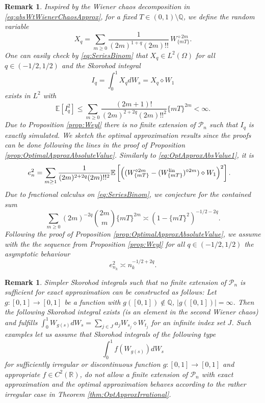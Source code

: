 \documentclass[a4paper,11pt,reqno]{amsart}
\theoremstyle{plain}
\newtheorem{remark}[theorem]{Remark}
\def\Q{\mathbb{Q}}
\def\R{\mathbb{R}}
\def\P{\mathcal{P}}
\def\ex{\mathbb{E}}
\def\lin{{\rm lin}}
\numberwithin{equation}{section}
\begin{document}
\begin{remark}
Inspired by the Wiener chaos decomposition in \eqref{eq:absWtWienerChaosApprox},
for a fixed $T \in (0,1) \setminus \Q$, we define the random variable
\[
X_q = \sum\limits_{m \geq 0} \frac{1}{(2m)^{1+q} (2m)!!}\, W_{\{mT\}}^{\diamond 2m}.
\]
One can easily check by \eqref{eq:SeriesBinom} that $X_q \in L^2(\Omega)$ for all $q \in (-1/2,1/2)$ and the Skorohod integral 
\[
I_q = \int_{0}^{1} X_q dW_s = X_q \diamond W_1 
\]
exists in $L^2$ with
\[
\ex[I_q^2] \leq \sum\limits_{m \geq 0} \frac{(2m+1)!}{(2m)^{2+2q} (2m)!!^2} \{mT\}^{2m} <\infty.
\]
Due to Proposition \ref{prop:Weyl} there is no finite extension of $\P_n$ such that $I_q$ is exactly simulated. We sketch the optimal approximation results since the proofs can be done following the lines in the proof of Proposition \ref{prop:OptimalApproxAbsoluteValue}. Similarly to \eqref{eq:OptApproxAbsValue1}, it is  
\begin{align}
e_n^2 &= \sum\limits_{m \geq 1} \frac{1}{(2m)^{2+2q} (2m)!!^2}\ex\left[\left((W_{\{mT\}}^{\diamond 2m} -(W_{\{mT\}}^{\lin})^{\diamond 2m})\diamond W_1\right)^2\right].
\label{eq:IrregularMSE}
\end{align}
Due to fractional calculus on \eqref{eq:SeriesBinom}, we conjecture for the contained sum
\[
\sum\limits_{m \geq 0} (2m)^{-2q}\binom{2m}{m} \{mT\}^{2m} \asymp (1-\{mT\}^{2})^{-1/2-2q}.
\]
Following the proof of  Proposition \ref{prop:OptimalApproxAbsoluteValue}, we assume with the the sequence from Proposition \ref{prop:Weyl} for all $q \in (-1/2,1/2)$ the asymptotic behaviour
\[
e_{n_k}^2 \asymp n_k^{-1/2+2q}.
\]
\end{remark}

\begin{remark}
Simpler Skorohod integrals such that no finite extension of $\P_n$ is sufficient for exact approximation can be constructed as follows: Let $g : [0,1] \rightarrow [0,1]$ be a function with $g([0,1]) \notin \Q$, $|g([0,1])|=\infty$. Then the following Skorohod integral exists (is an element in the second Wiener chaos) and fulfills
$\int_{0}^{1} W_{g(s)} dW_s  = \sum_{j \in J} a_j W_{s_j} \diamond W_{t_j}$
for an infinite index set $J$. Such examples let us assume that Skorohod integrals of the following type
\[
\int_{0}^{1} f(W_{g(s)}) dW_s 
\]
for sufficiently irregular or discontinuous function $g: [0,1] \rightarrow [0,1]$ and appropriate $f \in C^2(\R)$, do not allow a finite extension of $\P_n$ with exact approximation and the optimal approximation behaves according to the rather irregular case in Theorem \ref{thm:OptApproxIrrational}.
\end{remark}
\end{document}

